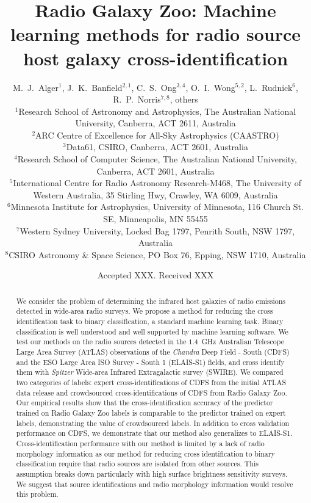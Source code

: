 \documentclass[fleqn,usenatbib,usedcolumn]{mnras}
\title[Machine learning methods for radio source cross-identification]{Radio Galaxy Zoo: Machine learning methods for radio source host galaxy cross-identification}
\author[Alger et al.]{
  M.~J.~Alger$^{1}$,
  J.~K.~Banfield$^{2, 1}$,
  C.~S.~Ong$^{3, 4}$,
  O.~I.~Wong$^{5, 2}$,
  L.~Rudnick$^{6}$,
  R.~P.~Norris$^{7, 8}$, others
\\
$^{1}$Research School of Astronomy and Astrophysics, The Australian National University, Canberra, ACT 2611, Australia\\
$^{2}$ARC Centre of Excellence for All-Sky Astrophysics (CAASTRO)\\
$^{3}$Data61, CSIRO, Canberra, ACT 2601, Australia\\
$^{4}$Research School of Computer Science, The Australian National University, Canberra, ACT 2601, Australia\\
$^{5}$International Centre for Radio Astronomy Research-M468, The University of Western Australia, 35 Stirling Hwy, Crawley, WA 6009, Australia\\
$^{6}$Minnesota Institute for Astrophysics, University of Minnesota, 116 Church St. SE, Minneapolis, MN 55455\\
$^{7}$Western Sydney University, Locked Bag 1797, Penrith South, NSW 1797, Australia\\
$^{8}$CSIRO Astronomy \& Space Science, PO Box 76, Epping, NSW 1710, Australia
}
\date{Accepted XXX. Received XXX}
\begin{document}
\label{firstpage}
\pagerange{\pageref{firstpage}--\pageref{lastpage}}
\maketitle

\begin{abstract}
  We consider the problem of determining the
  infrared host galaxies of radio emissions detected in wide-area radio
  surveys. We propose a method for reducing the cross identification task
  to binary classification, a standard machine learning task.
  Binary classification is well understood
  and well supported by machine learning software.
  We test our methods on the radio sources detected in the $1.4$~GHz
  Australian Telescope Large Area Survey (ATLAS) observations of the
  \emph{Chandra} Deep Field - South (CDFS) and the ESO Large Area ISO Survey -
  South 1 (ELAIS-S1) fields, and cross identify them with
  \emph{Spitzer} Wide-area Infrared Extragalactic survey (SWIRE).
  We compared two categories of labels:
  expert cross-identifications of CDFS from the initial ATLAS data release and
  crowdsourced cross-identifications of CDFS from Radio Galaxy Zoo.
  Our empirical results show that the cross-identification accuracy of
  the predictor trained on Radio Galaxy Zoo labels is comparable to the predictor trained
  on expert labels, demonstrating the value of crowdsourced labels.
  In addition to cross validation performance on CDFS, we demonstrate that
  our method also generalizes to ELAIS-S1.
  Cross-identification performance with our method is limited by a lack of
  radio morphology information as our method for reducing cross identification
  to binary classification require that radio sources
  are isolated from other sources. This assumption breaks down particularly
  with high surface brightness sensitivity surveys. We suggest that source
  identifications and radio morphology information would resolve this problem.
\end{abstract}
\end{document}
